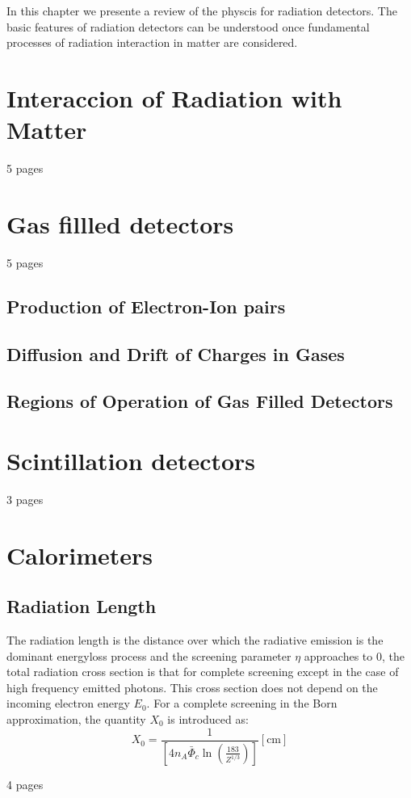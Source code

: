 
In this chapter we presente a review of the physcis for radiation detectors.
The basic features of radiation detectors can be understood once fundamental processes of radiation interaction in
matter are considered.
\section{Interaccion of Radiation with Matter}
5 pages
\section{Gas fillled detectors}
5 pages
\subsection{Production of Electron-Ion pairs}
\subsection{Diffusion and Drift of Charges in Gases}
\subsection{Regions of Operation of Gas Filled Detectors}
\section{Scintillation detectors}
3 pages
\section{Calorimeters}
\subsection{Radiation Length}
The radiation length is the distance over which the radiative emission is the dominant energyloss process and the
screening parameter $\eta$ approaches to 0, the total radiation cross section is that for complete screening except in
the case of high frequency emitted photons. This cross section does not depend on the incoming electron energy $E_0$.
For a complete screening in the Born approximation, the quantity $X_0$ is introduced as:
\begin{equation}\label{x0}
X_0 = \frac{1}{\left[4n_A\bar{\Phi}_c\ln\left(\frac{183}{Z^{1/3}}\right)\right]}\mathrm{[cm]}
\end{equation}

4 pages




